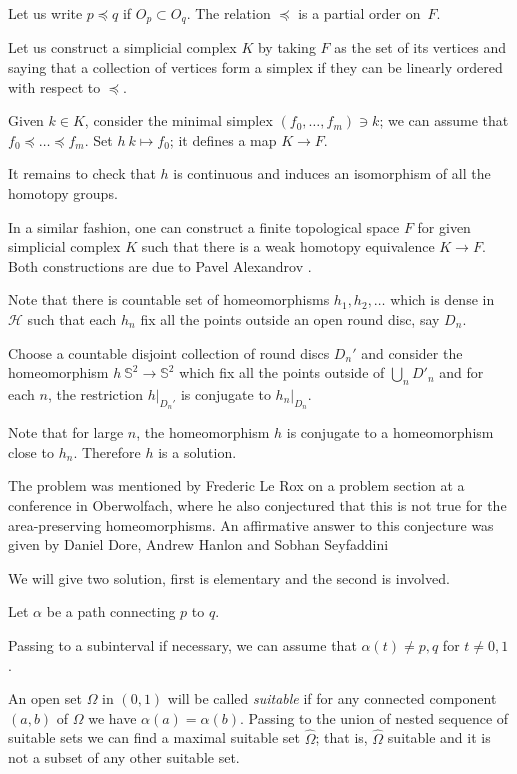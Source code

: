 Let us write $p\preccurlyeq q$ 
if $O_p\subset O_q$.
The relation $\preccurlyeq$ is a partial order on~$F$.

Let us construct a simplicial complex $K$ 
by taking $F$ as the set of its vertices
and saying that a collection of vertices form a simplex 
if they can be linearly ordered with respect to $\preccurlyeq$.

Given $k\in K$,
consider the minimal simplex $(f_0,\dots,f_m)\ni k$;
we can assume that $f_0\preccurlyeq \dots\preccurlyeq f_m$.
Set $h\:k\mapsto f_0$;
it defines a map $K\to F$.

It remains to check that $h$ is continuous 
and induces an isomorphism of all the homotopy groups.
\qeds

In a similar fashion, one can construct a finite topological space $F$ for given simplicial complex $K$ 
such that 
there is a weak homotopy equivalence $K\to F$.
Both constructions are due to Pavel Alexandrov
\cite[see][]{alexandrov-finite,mccord}.

Note that there is countable set of homeomorphisms $h_1,h_2,\dots$ which is dense in $\mathcal{H}$
such that
each $h_n$ fix all the points outside an open round disc, say $D_n$.

Choose a countable disjoint collection of round discs $D_n'$
and consider the homeomorphism $h\:\mathbb S^2\to \mathbb S^2$
which fix all the points outside of $\bigcup_nD'_n$ and
for each $n$,
the restriction $h|_{D_n'}$ is conjugate to $h_n|_{D_n}$. 


Note that for large $n$, the homeomorphism $h$ is conjugate to a homeomorphism close to $h_n$.
Therefore $h$ is a solution.
\qeds

The problem was mentioned by Frederic Le Rox \cite[see][]{rox} on a problem section at a conference in Oberwolfach, 
where he also conjectured that this is not true for the area-preserving homeomorphisms.
An affirmative answer to this conjecture was given by Daniel Dore, Andrew Hanlon and Sobhan Seyfaddini 
\cite[see][]{dore-hanlon,seyfaddini}

We will give two solution, first is elementary and the second is involved. 

Let $\alpha$ be a path connecting $p$ to $q$.

Passing to a subinterval if necessary,
we can assume that $\alpha(t)\ne p,q$ for $t\ne0,1$.

An open set $\Omega$ in $(0,1)$ will be called {}\emph{suitable}
if for any connected component $(a,b)$ of $\Omega$ we have $\alpha(a)=\alpha(b)$.
Passing to the union of nested sequence of suitable sets we can find a maximal suitable set $\hat \Omega$;
that is, $\hat \Omega$ suitable and it is not a subset of any other suitable set.

